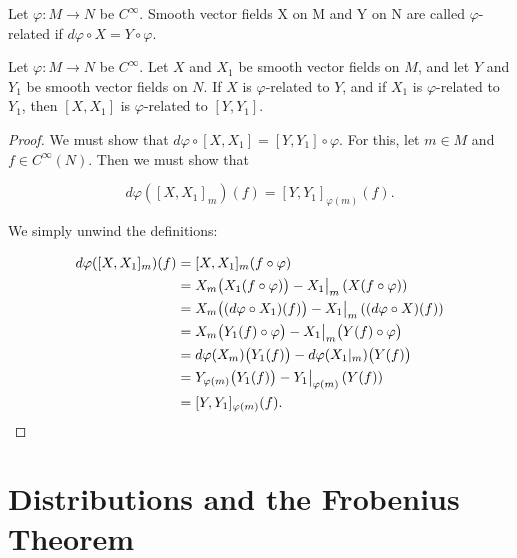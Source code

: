 \begin{definition}\label{thm:1.54}
	Let  $ \varphi: M \to N $ be  $ C^\infty $. Smooth vector fields X on M and Y on N are called  $ \varphi $-related if  $ d\varphi \circ X = Y \circ \varphi $.

\end{definition}

\begin{proposition}\label{thm:1.55}
	Let $\varphi: M \to N$ be $C^\infty$. Let $X$ and $X_1$ be smooth vector fields on $M$, and let $Y$ and $Y_1$ be smooth vector fields on $N$. If $X$ is $\varphi$-related to $Y$, and if $X_1$ is $\varphi$-related to $Y_1$, then $[X, X_1]$ is $\varphi$-related to $[Y, Y_1]$.

\end{proposition}

\begin{proof}
	We must show that $d\varphi \circ [X, X_1] = [Y, Y_1] \circ \varphi$. For this, let  $ m \in M $ and  $f \in C^{\infty}(N)$. Then we must show that

	\begin{equation}
		\tag{1}\label{eq:1.55:1}
		d\varphi([X,X_{1}]_{m})(f)=[Y,Y_{1}]_{\varphi(m)}(f).
	\end{equation}

	We simply unwind the definitions:

	\[
		\begin{aligned}{d\varphi([X,X_{1}]_{m})(f)}&{{}=[X,X_{1}]_{m}(f\circ\varphi)}\\ {}&{{}=X_{m}\big(X_{1}(f\circ\varphi)\big)-X_{1}\big|_{m}\left(X(f\circ\varphi)\right)}\\ {}&{{}=X_{m}\big((d\varphi\circ X_{1})(f)\big)-X_{1}\big|_{m}\left((d\varphi\circ X)(f)\right)}\\ {}&{{}=X_{m}\big(Y_{1}(f)\circ\varphi\big)-X_{1}\big|_{m}\big(Y(f)\circ\varphi\big)}\\ {}&{{}=d\varphi(X_{m})\big(Y_{1}(f)\big)-d\varphi(X_{1}|_{m})\big(Y(f)\big)}\\ {}&{{}=Y_{\varphi(m)}\big(Y_{1}(f)\big)-Y_{1}\big|_{\varphi(m)}\left(Y(f)\right)}\\ {}&{{}=[Y,Y_{1}]_{\varphi(m)}(f).}\\ \end{aligned}
		\qedhere
	\]
\end{proof}

\section{Distributions and the Frobenius Theorem}


